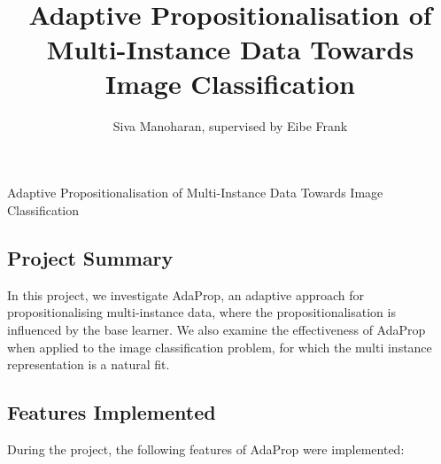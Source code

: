 \documentclass[a4paper,12pt]{article} %
\title{\ \\ \  \\ Adaptive Propositionalisation of Multi-Instance Data Towards Image Classification}
\author{Siva Manoharan, supervised by Eibe Frank}
\date{} %
\begin{document}
\onehalfspacing

{}

\begin{center}
\LARGE
Adaptive Propositionalisation of Multi-Instance Data Towards Image Classification
\end{center}


\subsection*{Project Summary}

In this project, 
    we investigate AdaProp, an
    adaptive approach for propositionalising
    multi-instance data, 
    where the propositionalisation 
    is influenced by 
    the base learner.
We also examine the effectiveness of 
    AdaProp when applied to the 
    image classification problem, 
    for which the multi instance representation
    is a natural fit.



\subsection*{Features Implemented}

During the project, 
    the following features of AdaProp were implemented:
\end{document}
